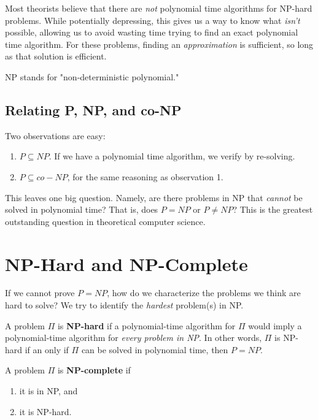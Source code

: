 \documentclass[titlepage, 12pt, leqno]{article}
\begin{document}
Most theorists believe that there are \textit{not} polynomial time algorithms
for NP-hard problems. While potentially depressing, this gives us a way to know
what \textit{isn't} possible, allowing us to avoid wasting time trying to find
an exact polynomial time algorithm. For these problems, finding an 
\textit{approximation} is sufficient, so long as that solution is efficient.

\begin{note}
    NP stands for "non-deterministic polynomial."
\end{note}

\subsection{Relating P, NP, and co-NP}
Two observations are easy:
\begin{enumerate}
    \item $P \subseteq NP$. If we have a polynomial time algorithm, we verify
        by re-solving.
    \item $P \subseteq co-NP$, for the same reasoning as observation 1.
\end{enumerate}
This leaves one big question. Namely, are there problems in NP that 
\textit{cannot} be solved in polynomial time? That is, does $P = NP$ or
$P\ne NP$? This is the greatest outstanding question in theoretical computer
science.

\pagebreak
\section{NP-Hard and NP-Complete}
If we cannot prove $P = NP$, how do we characterize the problems we think are
hard to solve? We try to identify the \textit{hardest} problem(s) in NP.

\begin{definition}
    A problem $\Pi$ is \textbf{NP-hard} if a polynomial-time algorithm for
    $\Pi$ would imply a polynomial-time algorithm for \textit{every problem in
    NP}. In other words, $\Pi$ is NP-hard if an only if $\Pi$ can be solved in
    polynomial time, then $P = NP$.
\end{definition}

\begin{definition}
    A problem $\Pi$ is \textbf{NP-complete} if
    \begin{enumerate}
        \item it is in NP, and
        \item it is NP-hard.
    \end{enumerate}
\end{definition}
\end{document}
